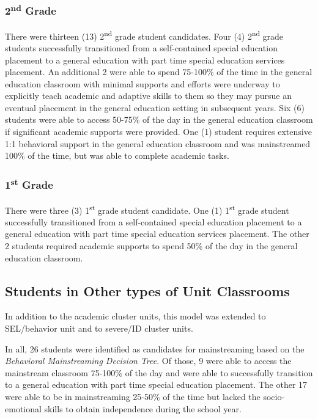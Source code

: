 \documentclass[twoside]{article}
\begin{document}
\subsubsection{2\textsuperscript{nd} Grade}
There were thirteen (13) 2\textsuperscript{nd} grade student candidates.
Four (4) 2\textsuperscript{nd} grade students successfully transitioned from a self-contained special education placement to a general education with part time special education services placement. An additional 2 were able to spend 75-100\% of the time in the general education classroom with minimal supports and efforts were underway to explicitly teach academic and adaptive skills to them so they may pursue an eventual placement in the general education setting in subsequent years. Six (6) students were able to access 50-75\% of the day in the general education classroom if significant academic supports were provided. One (1) student requires extensive 1:1 behavioral support in the general education classroom and was mainstreamed 100\% of the time, but was able to complete academic tasks.

\subsubsection{1\textsuperscript{st} Grade}
There were three (3) 1\textsuperscript{st} grade student candidate.
One (1) 1\textsuperscript{st} grade student successfully transitioned from a self-contained special education placement to a general education with part time special education services placement. The other 2 students required academic supports to spend 50\% of the day in the general education classroom. 

\subsection{Students in Other types of Unit Classrooms}
In addition to the academic cluster units, this model was extended to SEL/behavior unit and to severe/ID cluster units. 

In all, 26 students were identified as candidates for mainstreaming based on the \textit{Behavioral Mainstreaming Decision Tree}. Of those, 9 were able to access the mainstream classroom 75-100\% of the day and were able to successfully transition to a general education with part time special education placement. The other 17 were able to be in mainstreaming 25-50\% of the time but lacked the socio-emotional skills to obtain independence during the school year. 
\end{document}
